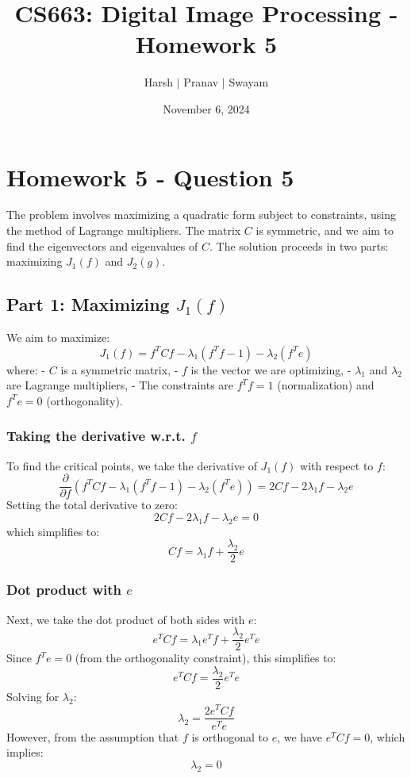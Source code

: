 \documentclass{article}
\title{CS663: Digital Image Processing - Homework 5}
\author{Harsh $\vert$ Pranav $\vert$ Swayam}
\date{November 6, 2024}
\begin{document}
\maketitle
\flushleft
\section*{Homework 5 - Question 5}

The problem involves maximizing a quadratic form subject to constraints, using the method of Lagrange multipliers. The matrix $C$ is symmetric, and we aim to find the eigenvectors and eigenvalues of $C$. The solution proceeds in two parts: maximizing $J_1(f)$ and $J_2(g)$.

\subsection*{Part 1: Maximizing $J_1(f)$}
We aim to maximize:
\[
J_1(f) = f^T C f - \lambda_1 (f^T f - 1) - \lambda_2 (f^T e)
\]
where:
- $C$ is a symmetric matrix,
- $f$ is the vector we are optimizing,
- $\lambda_1$ and $\lambda_2$ are Lagrange multipliers,
- The constraints are $f^T f = 1$ (normalization) and $f^T e = 0$ (orthogonality).

\subsubsection*{Taking the derivative w.r.t. $f$}

To find the critical points, we take the derivative of $J_1(f)$ with respect to $f$:
\[
\frac{\partial}{\partial f} (f^T C f - \lambda_1 (f^T f - 1) - \lambda_2 (f^T e)) = 2 C f - 2 \lambda_1 f - \lambda_2 e 
\]
Setting the total derivative to zero:
\[
2 C f - 2 \lambda_1 f - \lambda_2 e = 0
\]
which simplifies to:
\[
C f = \lambda_1 f + \frac{\lambda_2}{2} e
\]

\subsubsection*{Dot product with $e$}

Next, we take the dot product of both sides with $e$:
\[
e^T C f = \lambda_1 e^T f + \frac{\lambda_2}{2} e^T e
\]
Since $f^T e = 0$ (from the orthogonality constraint), this simplifies to:
\[
e^T C f = \frac{\lambda_2}{2} e^T e
\]
Solving for $\lambda_2$:
\[
\lambda_2 = \frac{2 e^T C f}{e^T e}
\]
However, from the assumption that $f$ is orthogonal to $e$, we have $e^T C f = 0$, which implies:
\[
\lambda_2 = 0
\]
\end{document}
